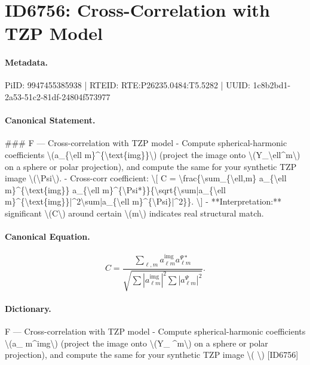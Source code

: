 \section*{ID6756: Cross-Correlation with TZP Model}
\paragraph{Metadata.}
PiID: 9947455385938 | RTEID: RTE:P26235.0484:T5.5282 | UUID: 1c8b2bd1-2a53-51c2-81df-24804f573977

\paragraph{Canonical Statement.}
\#\#\# F — Cross-correlation with TZP model - Compute spherical-harmonic coefficients \textbackslash{}(a\_\{\textbackslash{}ell m\}\textasciicircum{}\{\textbackslash{}text\{img\}\}\textbackslash{}) (project the image onto \textbackslash{}(Y\_\textbackslash{}ell\textasciicircum{}m\textbackslash{}) on a sphere or polar projection), and compute the same for your synthetic TZP image \textbackslash{}(\textbackslash{}Psi\textbackslash{}). - Cross-corr coefficient: \textbackslash{}[ C = \textbackslash{}frac\{\textbackslash{}sum\_\{\textbackslash{}ell,m\} a\_\{\textbackslash{}ell m\}\textasciicircum{}\{\textbackslash{}text\{img\}\} a\_\{\textbackslash{}ell m\}\textasciicircum{}\{\textbackslash{}Psi*\}\}\{\textbackslash{}sqrt\{\textbackslash{}sum|a\_\{\textbackslash{}ell m\}\textasciicircum{}\{\textbackslash{}text\{img\}\}|\textasciicircum{}2\textbackslash{}sum|a\_\{\textbackslash{}ell m\}\textasciicircum{}\{\textbackslash{}Psi\}|\textasciicircum{}2\}\}. \textbackslash{}] - **Interpretation:** significant \textbackslash{}(C\textbackslash{}) around certain \textbackslash{}(m\textbackslash{}) indicates real structural match.

\paragraph{Canonical Equation.}
\[
C = \frac{\sum_{\ell,m} a_{\ell m}^{\text{img}} a_{\ell m}^{\Psi*}}{\sqrt{\sum|a_{\ell m}^{\text{img}}|^2\sum|a_{\ell m}^{\Psi}|^2}}.
\]

\paragraph{Dictionary.}
F — Cross-correlation with TZP model - Compute spherical-harmonic coefficients \textbackslash{}(a\_ m\textasciicircum{}img\textbackslash{}) (project the image onto \textbackslash{}(Y\_ \textasciicircum{}m\textbackslash{}) on a sphere or polar projection), and compute the same for your synthetic TZP image \textbackslash{}( \textbackslash{}) [ID6756]

